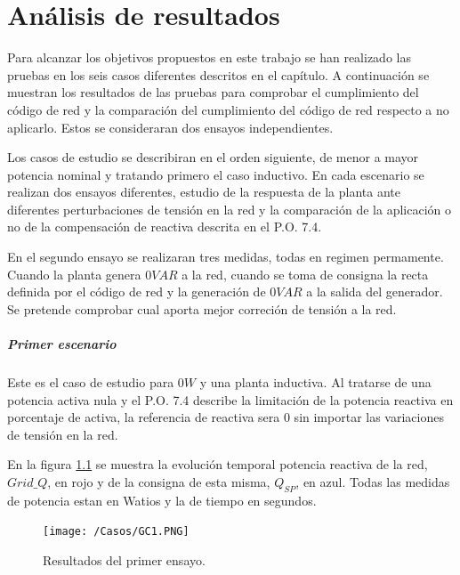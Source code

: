 \documentclass{book}
\begin{document}
\chapter{An\'alisis de resultados}

Para alcanzar los objetivos propuestos en este trabajo se han realizado las pruebas en los seis casos diferentes descritos en el cap\'itulo. A continuaci\'on se muestran los resultados de las pruebas para comprobar el cumplimiento del c\'odigo de red y la comparaci\'on del cumplimiento del c\'odigo de red respecto a no aplicarlo. Estos se consideraran dos ensayos independientes. \par

Los casos de estudio se describiran en el orden siguiente, de menor a mayor potencia nominal y tratando primero el caso inductivo. En cada escenario se realizan dos ensayos diferentes, estudio de la respuesta de la planta ante diferentes perturbaciones de tensi\'on en la red y la comparaci\'on de la aplicaci\'on o no de la compensaci\'on de reactiva descrita en el P.O. 7.4.\par

En el segundo ensayo se realizaran tres medidas, todas en regimen permamente. Cuando la planta genera $0 VAR$ a la red, cuando se toma de consigna la recta definida por el c\'odigo de red y la generaci\'on de $0VAR$ a la salida  del generador. Se pretende comprobar cual aporta mejor correci\'on de tensi\'on a la red. \par 

	\paragraph{Primer escenario} 

Este es el caso de estudio para $0W$ y una planta inductiva. Al tratarse de una potencia activa nula y el P.O. 7.4 describe la limitaci\'on de la potencia reactiva en porcentaje de activa, la referencia de reactiva sera 0 sin importar las variaciones de tensi\'on en la red. \par

En la figura \ref{GC1} se muestra la evoluci\'on temporal potencia reactiva de la red, $Grid\_Q$, en rojo y de la consigna de esta misma, $Q_{SP}$, en azul. Todas las medidas de potencia estan en Watios y la de tiempo en segundos.\par

\begin{figure}[h!]
\centering
\texttt{[image: /Casos/GC1.PNG]}
\caption{Resultados del primer ensayo. }
\label{GC1}
\end{figure} \par
\end{document}
